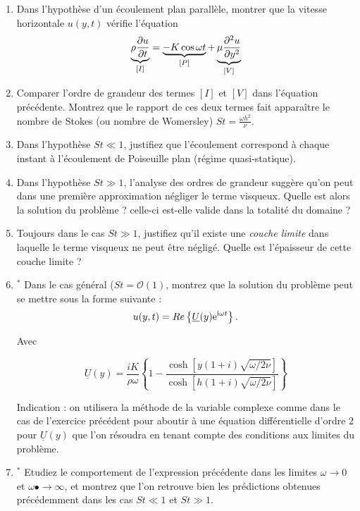 \begin{enumerate}
\item 
Dans l'hypoth\`ese d'un \'ecoulement plan parall\`ele, montrer que
la vitesse horizontale $u(y, t)$ v\'erifie l'\'equation
\begin{equation}
\underbrace{\rho \frac {\partial u} {\partial t}}_{[I]} = \underbrace{- K \cos \omega t}_{[P]} + \underbrace{\mu \frac {\partial^{2} u} {\partial y ^{2}}}_{[V]}
\label{eq:ns}
\end{equation}

\item Comparer l'ordre de grandeur des termes $[I]$ et $[V]$ dans l'équation précédente. Montrez que le rapport de ces deux termes fait apparaître 
le nombre de Stokes (ou nombre de Womersley) $St = \frac{\omega h^2  }{\nu}$.

\item Dans l'hypothèse $St \ll 1$, justifiez que l'écoulement correspond à chaque instant à l'écoulement de Poiseuille plan   
(régime quasi-statique).

\item Dans l'hypothèse $St \gg 1$, l'analyse des ordres de grandeur suggère qu'on peut dans une première approximation
négliger le terme visqueux. Quelle est alors la solution du problème ? celle-ci est-elle valide dans la totalité du domaine ?

\item Toujours dans le cas  $St \gg 1$, justifiez qu'il existe une {\em couche limite} dans laquelle le terme visqueux ne peut être négligé. 
Quelle est l'épaisseur de cette couche limite ?

\item $^*$ Dans le cas général ($St = {\mathcal O}(1)$, montrez que la solution du problème peut se mettre sous la forme suivante :
$$u(y, t) = Re \left \{  \underline{U}(y) \mathrm{e}^{\mathrm{i} \omega t} \right \}.$$

Avec 

\begin{equation}
\label{sol}
 \underline{U}(y) = \frac{iK}{\rho \omega} \left \{ 
1 - \frac{\cosh [ y ( 1+i) \sqrt{\omega / 2\nu} ]}{\cosh [ 
h ( 1+i) \sqrt{\omega / 2\nu} ]}
\right \}
\end{equation}

Indication : on utilisera la méthode de la variable complexe comme dans le cas de l'exercice précédent pour aboutir à une équation différentielle d'ordre 2 pour $ \underline{U}(y)$ que l'on résoudra en tenant compte des conditions aux limites du problème.

\item $^*$ Etudiez le comportement de l'expression précédente dans les limites  $\omega \rightarrow 0 $ et $\omega •\rightarrow \infty$, et montrez que l'on retrouve bien les prédictions obtenues précédemment dans les cas $St \ll 1$ et $St \gg 1$.





\end{enumerate}
